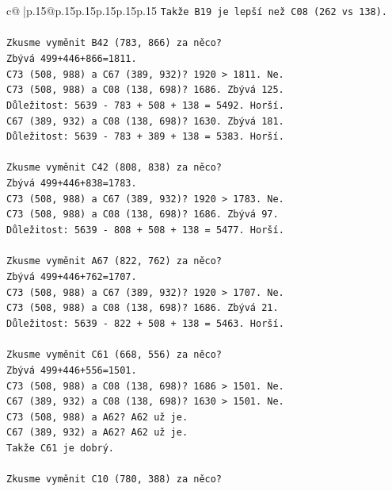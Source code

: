 \documentclass{article}
\begin{document}
{\begin{supertabular}{c@{$\;$}|p{.15\linewidth}@{}p{.15\linewidth}p{.15\linewidth}p{.15\linewidth}p{.15\linewidth}p{.15\linewidth}}
{{{\texttt{Takže B19 je lepší než C08 (262 vs 138).} \\
\\ 
\texttt{Zkusme vyměnit B42 (783, 866) za něco?} \\
\texttt{Zbývá 499+446+866=1811.} \\
\texttt{C73 (508, 988) a C67 (389, 932)? 1920 > 1811. Ne.} \\
\texttt{C73 (508, 988) a C08 (138, 698)? 1686. Zbývá 125.} \\
\texttt{Důležitost: 5639 {-} 783 + 508 + 138 = 5492. Horší.} \\
\texttt{C67 (389, 932) a C08 (138, 698)? 1630. Zbývá 181.} \\
\texttt{Důležitost: 5639 {-} 783 + 389 + 138 = 5383. Horší.} \\
\\ 
\texttt{Zkusme vyměnit C42 (808, 838) za něco?} \\
\texttt{Zbývá 499+446+838=1783.} \\
\texttt{C73 (508, 988) a C67 (389, 932)? 1920 > 1783. Ne.} \\
\texttt{C73 (508, 988) a C08 (138, 698)? 1686. Zbývá 97.} \\
\texttt{Důležitost: 5639 {-} 808 + 508 + 138 = 5477. Horší.} \\
\\ 
\texttt{Zkusme vyměnit A67 (822, 762) za něco?} \\
\texttt{Zbývá 499+446+762=1707.} \\
\texttt{C73 (508, 988) a C67 (389, 932)? 1920 > 1707. Ne.} \\
\texttt{C73 (508, 988) a C08 (138, 698)? 1686. Zbývá 21.} \\
\texttt{Důležitost: 5639 {-} 822 + 508 + 138 = 5463. Horší.} \\
\\ 
\texttt{Zkusme vyměnit C61 (668, 556) za něco?} \\
\texttt{Zbývá 499+446+556=1501.} \\
\texttt{C73 (508, 988) a C08 (138, 698)? 1686 > 1501. Ne.} \\
\texttt{C67 (389, 932) a C08 (138, 698)? 1630 > 1501. Ne.} \\
\texttt{C73 (508, 988) a A62? A62 už je.} \\
\texttt{C67 (389, 932) a A62? A62 už je.} \\
\texttt{Takže C61 je dobrý.} \\
\\ 
\texttt{Zkusme vyměnit C10 (780, 388) za něco?} \\
}}}
\end{supertabular}}
\end{document}
